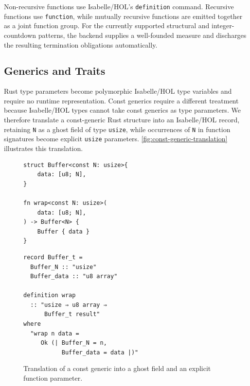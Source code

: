 Non-recursive functions use Isabelle/HOL's \texttt{definition} command.
Recursive functions use \texttt{function}, while mutually recursive functions are emitted together as a joint function group.
For the currently supported structural and integer-countdown patterns, the backend supplies a well-founded measure and discharges the resulting termination obligations automatically.

\subsection{Generics and Traits}
\label{sec:traits}

Rust type parameters become polymorphic Isabelle/HOL type variables and require no runtime representation.
Const generics require a different treatment because Isabelle/HOL types cannot take const generics as type parameters.
We therefore translate a const-generic Rust structure into an Isabelle/HOL record, retaining \texttt{N} as a ghost field of type \texttt{usize}, while occurrences of \texttt{N} in function signatures become explicit \texttt{usize} parameters. \autoref{fig:const-generic-translation} illustrates this translation.

\begin{figure}[!ht]
\centering
\begin{minipage}{0.96\linewidth}
\begin{minipage}[t]{0.43\linewidth}
\vspace{0pt}
\centering
\begin{verbatim}
struct Buffer<const N: usize>{
    data: [u8; N],
}

fn wrap<const N: usize>(
    data: [u8; N],
) -> Buffer<N> {
    Buffer { data }
}
\end{verbatim}
\end{minipage}
\hfill
\vrule{}
\hfill
\begin{minipage}[t]{0.48\linewidth}
\vspace{0pt}
\centering
\begin{verbatim}
record Buffer_t =
  Buffer_N :: "usize"
  Buffer_data :: "u8 array"

definition wrap
  :: "usize ⇒ u8 array ⇒
      Buffer_t result"
where
  "wrap n data =
     Ok (| Buffer_N = n,
           Buffer_data = data |)"
\end{verbatim}
\end{minipage}
\end{minipage}
\caption{Translation of a const generic into a ghost field and an explicit
function parameter.}
\label{fig:const-generic-translation}
\end{figure}

